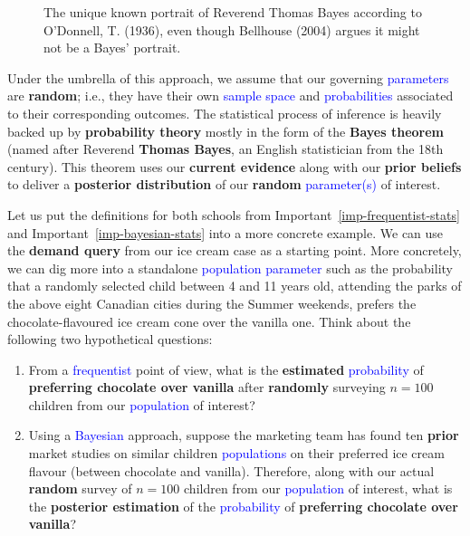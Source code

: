 \documentclass[
  letterpaper,
  DIV=11,
  numbers=noendperiod]{scrreprt}
\providecommand{\tightlist}{%
  \setlength{\itemsep}{0pt}\setlength{\parskip}{0pt}}\usepackage{longtable,booktabs,array}
\begin{document}
\begin{tcolorbox}
\begin{figure}[H]
{}

\caption{The unique known portrait of Reverend Thomas Bayes according to
O'Donnell, T. (1936), even though Bellhouse (2004) argues it might not
be a Bayes' portrait.}

\end{figure}%

Under the umbrella of this approach, we assume that our governing
\textcolor{blue}{parameters} are \textbf{random}; i.e., they have their
own \textcolor{blue}{sample space} and \textcolor{blue}{probabilities}
associated to their corresponding outcomes. The statistical process of
inference is heavily backed up by \textbf{probability theory} mostly in
the form of the \textbf{Bayes theorem} (named after Reverend
\textbf{Thomas Bayes}, an English statistician from the 18th century).
This theorem uses our \textbf{current evidence} along with our
\textbf{prior beliefs} to deliver a \textbf{posterior distribution} of
our \textbf{random} \textcolor{blue}{parameter(s)} of interest.

\end{tcolorbox}

Let us put the definitions for both schools from
Important~\ref{imp-frequentist-stats} and
Important~\ref{imp-bayesian-stats} into a more concrete example. We can
use the \textbf{demand query} from our ice cream case as a starting
point. More concretely, we can dig more into a standalone
\textcolor{blue}{population parameter} such as the probability that a
randomly selected child between 4 and 11 years old, attending the parks
of the above eight Canadian cities during the Summer weekends, prefers
the chocolate-flavoured ice cream cone over the vanilla one. Think about
the following two hypothetical questions:

\begin{enumerate}
\def\labelenumi{\alph{enumi}.}
\tightlist
\item
  From a \textcolor{blue}{frequentist} point of view, what is the
  \textbf{estimated} \textcolor{blue}{probability} of \textbf{preferring
  chocolate over vanilla} after \textbf{randomly} surveying \(n = 100\)
  children from our \textcolor{blue}{population} of interest?
\item
  Using a \textcolor{blue}{Bayesian} approach, suppose the marketing
  team has found ten \textbf{prior} market studies on similar children
  \textcolor{blue}{populations} on their preferred ice cream flavour
  (between chocolate and vanilla). Therefore, along with our actual
  \textbf{random} survey of \(n = 100\) children from our
  \textcolor{blue}{population} of interest, what is the
  \textbf{posterior estimation} of the \textcolor{blue}{probability} of
  \textbf{preferring chocolate over vanilla}?
\end{enumerate}
\end{document}
